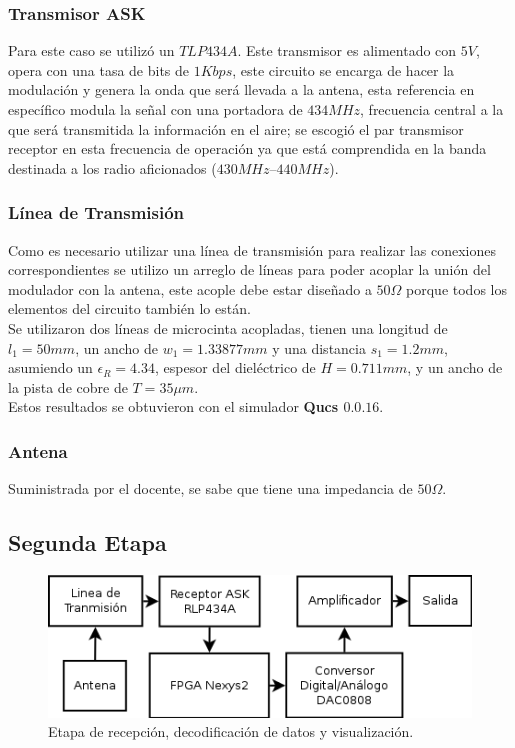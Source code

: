 \documentclass[10pt,graphicx,caption,rotating]{article}
\begin{document}
\subsubsection{Transmisor ASK}
\noindent
Para este caso se utilizó un $TLP434A$. Este transmisor es alimentado con $5 V$, opera con una tasa de bits de $1 Kbps$, este circuito se encarga de hacer la modulación y genera la onda que será llevada a la antena, esta referencia en específico modula la señal con una portadora de $434 MHz$, frecuencia central a la que será transmitida la información en el aire; se escogió el par transmisor receptor en esta frecuencia de operación ya que está comprendida en la banda destinada a los radio aficionados ($430 MHz – 440 MHz$).

\subsubsection{Línea de Transmisión} \label{LTx}
\noindent
Como es necesario utilizar una línea de transmisión para realizar las conexiones correspondientes se utilizo un arreglo de líneas para poder acoplar la unión del modulador con la antena, este acople debe estar diseñado a $50\Omega$ porque todos los elementos del circuito también lo están.\\
Se utilizaron dos líneas de microcinta acopladas, tienen una longitud de $l_1=50 mm$, un ancho de $w_1=1.33877mm$ y una distancia $s_1=1.2 mm$, asumiendo un $\epsilon _R = 4.34$, espesor del dieléctrico de $H=0.711mm$, y un ancho de la pista de cobre de $T=35 \mu m$.\\
Estos resultados se obtuvieron con el simulador \textbf{Qucs $0.0.16$}.

\subsubsection{Antena}
\noindent
Suministrada por el docente, se sabe que tiene una impedancia de $50 \Omega$.

\subsection{Segunda Etapa}
\begin{figure}[H]
	\centering
		\includegraphics[scale=0.55]{Diagrama2.png}
	\caption{Etapa de recepción, decodificación de datos y visualización.}
	\label{fig4}
\end{figure}
\end{document}
